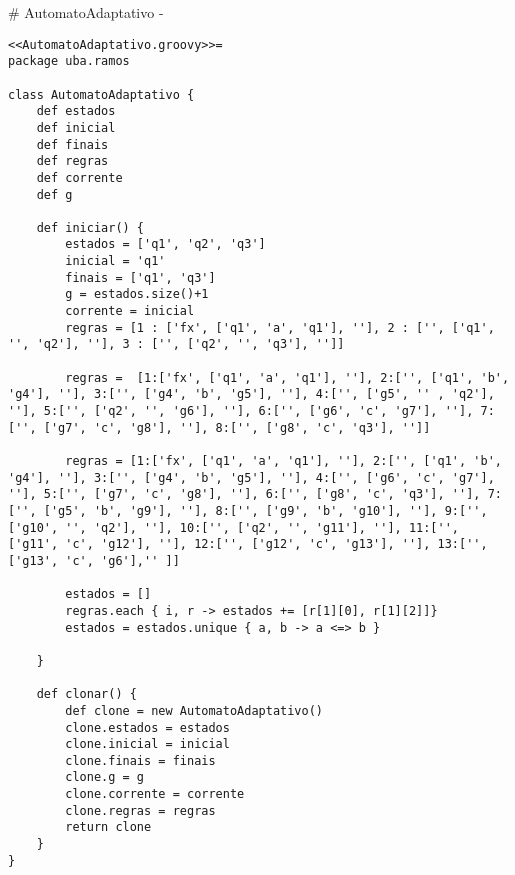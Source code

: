 # AutomatoAdaptativo {-}

\begin{lstlisting}[style=java]
<<AutomatoAdaptativo.groovy>>=
package uba.ramos

class AutomatoAdaptativo {
    def estados
    def inicial
    def finais
    def regras
    def corrente
    def g

    def iniciar() {
        estados = ['q1', 'q2', 'q3']
        inicial = 'q1'
        finais = ['q1', 'q3']
        g = estados.size()+1
        corrente = inicial
        regras = [1 : ['fx', ['q1', 'a', 'q1'], ''], 2 : ['', ['q1', '', 'q2'], ''], 3 : ['', ['q2', '', 'q3'], '']]

        regras =  [1:['fx', ['q1', 'a', 'q1'], ''], 2:['', ['q1', 'b', 'g4'], ''], 3:['', ['g4', 'b', 'g5'], ''], 4:['', ['g5', '' , 'q2'], ''], 5:['', ['q2', '', 'g6'], ''], 6:['', ['g6', 'c', 'g7'], ''], 7:['', ['g7', 'c', 'g8'], ''], 8:['', ['g8', 'c', 'q3'], '']]

        regras = [1:['fx', ['q1', 'a', 'q1'], ''], 2:['', ['q1', 'b', 'g4'], ''], 3:['', ['g4', 'b', 'g5'], ''], 4:['', ['g6', 'c', 'g7'], ''], 5:['', ['g7', 'c', 'g8'], ''], 6:['', ['g8', 'c', 'q3'], ''], 7:['', ['g5', 'b', 'g9'], ''], 8:['', ['g9', 'b', 'g10'], ''], 9:['', ['g10', '', 'q2'], ''], 10:['', ['q2', '', 'g11'], ''], 11:['', ['g11', 'c', 'g12'], ''], 12:['', ['g12', 'c', 'g13'], ''], 13:['', ['g13', 'c', 'g6'],'' ]]

        estados = []
        regras.each { i, r -> estados += [r[1][0], r[1][2]]}
        estados = estados.unique { a, b -> a <=> b }

    }

    def clonar() {
        def clone = new AutomatoAdaptativo()
        clone.estados = estados
        clone.inicial = inicial
        clone.finais = finais
        clone.g = g
        clone.corrente = corrente
        clone.regras = regras
        return clone
    }
}


\end{lstlisting}
